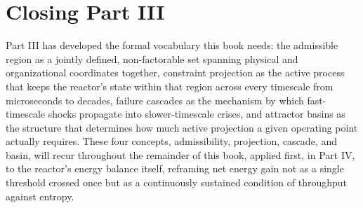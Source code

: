 \section{Closing Part III}

Part III has developed the formal vocabulary this book needs: the admissible region as a jointly defined, non-factorable set spanning physical and organizational coordinates together, constraint projection as the active process that keeps the reactor's state within that region across every timescale from microseconds to decades, failure cascades as the mechanism by which fast-timescale shocks propagate into slower-timescale crises, and attractor basins as the structure that determines how much active projection a given operating point actually requires. These four concepts, admissibility, projection, cascade, and basin, will recur throughout the remainder of this book, applied first, in Part IV, to the reactor's energy balance itself, reframing net energy gain not as a single threshold crossed once but as a continuously sustained condition of throughput against entropy.
